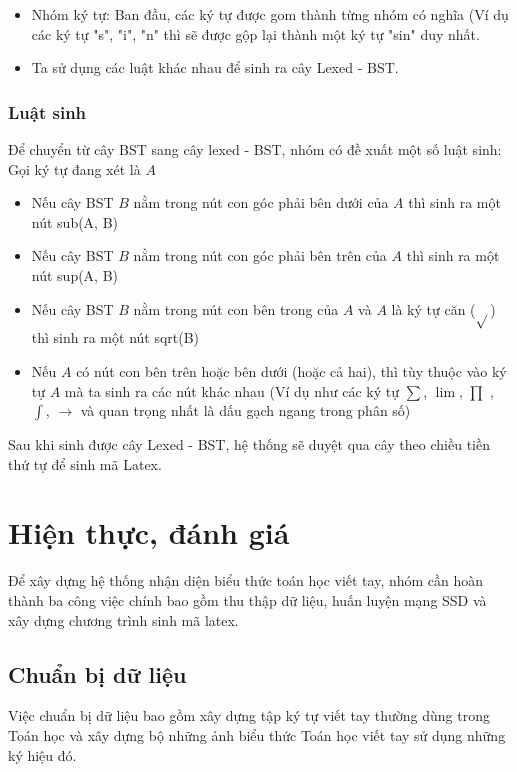 \documentclass[a4paper]{article}
\theoremstyle{definition}
\begin{document}
	\begin{itemize}
		\item Nhóm ký tự: Ban đầu, các ký tự được gom thành từng nhóm có nghĩa (Ví dụ các ký tự "s", "i", "n" thì sẽ được gộp lại thành một ký tự "sin" duy nhất.
		\item Ta sử dụng các luật khác nhau để sinh ra cây Lexed - BST\cite{zanibbi}.
	\end{itemize}
	
	\subsubsection*{Luật sinh}
	
	
	Để chuyển từ cây BST\cite{zanibbi} sang cây lexed - BST\cite{zanibbi}, nhóm có đề xuất một số luật sinh: \\
	Gọi ký tự đang xét là $A$
	\begin{itemize}
		\item Nếu cây BST $B$ nằm trong nút con góc phải bên dưới của $A$ thì sinh ra một nút sub(A, B)
		\item Nếu cây BST $B$ nằm trong nút con góc phải bên trên của $A$ thì sinh ra một nút sup(A, B)
		\item Nếu cây BST $B$ nằm trong nút con bên trong của $A$ và $A$ là ký tự căn ($\sqrt{}$) thì sinh ra một nút sqrt(B)
		\item Nếu $A$ có nút con bên trên hoặc bên dưới (hoặc cả hai), thì tùy thuộc vào ký tự $A$ mà ta sinh ra các nút khác nhau (Ví dụ như các ký tự $\sum$, $\lim$, $\prod$ , $\int$, $\rightarrow$ và quan trọng nhất là dấu gạch ngang trong phân số)
		
	\end{itemize}
	
	Sau khi sinh được cây Lexed - BST\cite{zanibbi}, hệ thống sẽ duyệt qua cây theo chiều tiền thứ tự để sinh mã Latex.
	
	\newpage
	\section{Hiện thực, đánh giá}
	
	Để xây dựng hệ thống nhận diện biểu thức toán học viết tay, nhóm cần hoàn thành ba công việc chính bao gồm thu thập dữ liệu, huấn luyện mạng SSD và xây dựng chương trình sinh mã latex.
	
	\subsection{Chuẩn bị dữ liệu}
	Việc chuẩn bị dữ liệu bao gồm xây dựng tập ký tự viết tay thường dùng trong Toán học và xây dựng bộ những ảnh biểu thức Toán học viết tay sử dụng những ký hiệu đó.
\end{document}
